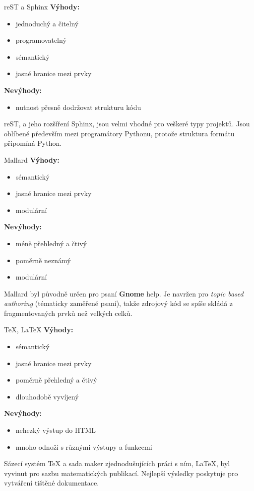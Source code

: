 \documentclass[12pt,a4paper]{beamer}
\begin{document}
	\begin{frame}{reST a Sphinx}
	\textbf{Výhody:}
	\begin{itemize}
		\item jednoduchý a čitelný
		\item programovatelný
		\item sémantický
		\item jasné hranice mezi prvky
	\end{itemize}	
	\textbf{Nevýhody:}
	\begin{itemize}
		\item nutnost přesně dodržovat strukturu kódu
	\end{itemize}				
	reST, a jeho rozšíření Sphinx, jsou velmi vhodné pro veškeré typy projektů. Jsou oblíbené především mezi programátory Pythonu, protože struktura formátu připomíná Python.
	\end{frame}

	\begin{frame}{Mallard}
	\textbf{Výhody:}
	\begin{itemize}
		\item sémantický
		\item jasné hranice mezi prvky
		\item modulární
	\end{itemize}	
	\textbf{Nevýhody:}
	\begin{itemize}
		\item méně přehledný a čtivý
		\item poměrně neznámý
		\item modulární
	\end{itemize}				
	Mallard byl původně určen pro psaní \textbf{Gnome} help. Je navržen pro \textit{topic based authoring} (tématicky zaměřené psaní), takže zdrojový kód se spíše skládá z fragmentovaných prvků než velkých celků.
	\end{frame}

	\begin{frame}{\TeX, \LaTeX}
	\textbf{Výhody:}
	\begin{itemize}
		\item sémantický
		\item jasné hranice mezi prvky
		\item poměrně přehledný a čtivý
		\item dlouhodobě vyvíjený
	\end{itemize}	
	\textbf{Nevýhody:}
	\begin{itemize}
		\item nehezký výstup do HTML
		\item mnoho odnoží s různými výstupy a funkcemi
	\end{itemize}				
	Sázecí systém \TeX{} a sada maker zjednodušujících práci s ním, \LaTeX, byl vyvinut pro sazbu matematických publikací. Nejlepší výsledky poskytuje pro vytváření tištěné dokumentace. 
	\end{frame}
\end{document}
